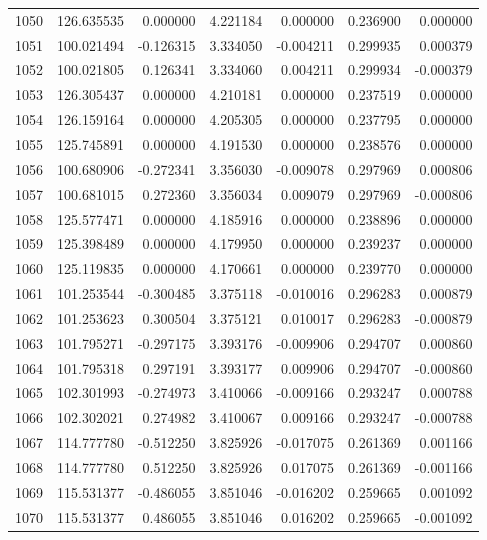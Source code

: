 \begin{tabular}{rrrrrrr}
1050 & 126.635535 &    0.000000 &  4.221184 &   0.000000 &   0.236900 &  0.000000 \\
1051 & 100.021494 &   -0.126315 &  3.334050 &  -0.004211 &   0.299935 &  0.000379 \\
1052 & 100.021805 &    0.126341 &  3.334060 &   0.004211 &   0.299934 & -0.000379 \\
1053 & 126.305437 &    0.000000 &  4.210181 &   0.000000 &   0.237519 &  0.000000 \\
1054 & 126.159164 &    0.000000 &  4.205305 &   0.000000 &   0.237795 &  0.000000 \\
1055 & 125.745891 &    0.000000 &  4.191530 &   0.000000 &   0.238576 &  0.000000 \\
1056 & 100.680906 &   -0.272341 &  3.356030 &  -0.009078 &   0.297969 &  0.000806 \\
1057 & 100.681015 &    0.272360 &  3.356034 &   0.009079 &   0.297969 & -0.000806 \\
1058 & 125.577471 &    0.000000 &  4.185916 &   0.000000 &   0.238896 &  0.000000 \\
1059 & 125.398489 &    0.000000 &  4.179950 &   0.000000 &   0.239237 &  0.000000 \\
1060 & 125.119835 &    0.000000 &  4.170661 &   0.000000 &   0.239770 &  0.000000 \\
1061 & 101.253544 &   -0.300485 &  3.375118 &  -0.010016 &   0.296283 &  0.000879 \\
1062 & 101.253623 &    0.300504 &  3.375121 &   0.010017 &   0.296283 & -0.000879 \\
1063 & 101.795271 &   -0.297175 &  3.393176 &  -0.009906 &   0.294707 &  0.000860 \\
1064 & 101.795318 &    0.297191 &  3.393177 &   0.009906 &   0.294707 & -0.000860 \\
1065 & 102.301993 &   -0.274973 &  3.410066 &  -0.009166 &   0.293247 &  0.000788 \\
1066 & 102.302021 &    0.274982 &  3.410067 &   0.009166 &   0.293247 & -0.000788 \\
1067 & 114.777780 &   -0.512250 &  3.825926 &  -0.017075 &   0.261369 &  0.001166 \\
1068 & 114.777780 &    0.512250 &  3.825926 &   0.017075 &   0.261369 & -0.001166 \\
1069 & 115.531377 &   -0.486055 &  3.851046 &  -0.016202 &   0.259665 &  0.001092 \\
1070 & 115.531377 &    0.486055 &  3.851046 &   0.016202 &   0.259665 & -0.001092 \\

\end{tabular}
